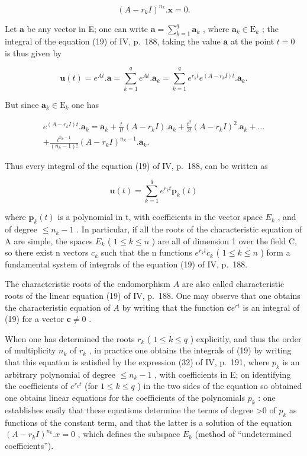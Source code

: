 \[
(A - r _ {k} I) ^ {n _ {k}}. \mathbf {x} = 0.
\]

Let \(\mathbf{a}\) be any vector in E; one can write \(\mathbf{a} = \sum_{k=1}^{q} \mathbf{a}_k\) , where \(\mathbf{a}_k \in \mathrm{E}_k\) ; the integral of the equation (19) of IV, p.~188, taking the value \(\mathbf{a}\) at the point \(t = 0\) is thus given by

\[
\mathbf {u} (t) = e ^ {A t}. \mathbf {a} = \sum_ {k = 1} ^ {q} e ^ {A t}. \mathbf {a} _ {k} = \sum_ {k = 1} ^ {q} e ^ {r _ {k} t} e ^ {(A - r _ {k} I) t}. \mathbf {a} _ {k}.
\]

But since \(\mathbf{a}_k\in \mathrm{E}_k\) one has

\[
\begin{array}{c} e ^ {(A - r _ {k} I) t}. \mathbf {a} _ {k} = \mathbf {a} _ {k} + \frac {t}{1 !} (A - r _ {k} I). \mathbf {a} _ {k} + \frac {t ^ {2}}{2 !} (A - r _ {k} I) ^ {2}. \mathbf {a} _ {k} + \dots \\ + \frac {t ^ {n _ {k} - 1}}{(n _ {k} - 1) !} (A - r _ {k} I) ^ {n _ {k} - 1}. \mathbf {a} _ {k}. \end{array}\tag{31}
\]

Thus every integral of the equation (19) of IV, p.~188, can be written as

\[
\mathbf {u} (t) = \sum_ {k = 1} ^ {q} e ^ {r _ {k} t} \mathbf {p} _ {k} (t)\tag{32}
\]

where \(\mathbf{p}_{k}(t)\) is a polynomial in t, with coefficients in the vector space \(E_{k}\) , and of degree \(\leqslant n_{k}-1\) . In particular, if all the roots of the characteristic equation of A are simple, the spaces \(E_{k}\) ( \(1 \leqslant k \leqslant n\) ) are all of dimension 1 over the field C, so there exist n vectors \(c_{k}\) such that the n functions \(e^{r_{k}t}c_{k}\) ( \(1 \leqslant k \leqslant n\) ) form a fundamental system of integrals of the equation (19) of IV, p.~188.

The characteristic roots of the endomorphism \(A\) are also called characteristic roots of the linear equation (19) of IV, p.~188. One may observe that one obtains the characteristic equation of \(A\) by writing that the function \(\mathbf{c}e^{rt}\) is an integral of (19) for a vector \(\mathbf{c} \neq 0\) .

When one has determined the roots \(r_{k}\) ( \(1 \leqslant k \leqslant q\) ) explicitly, and thus the order of multiplicity \(n_{k}\) of \(r_{k}\) , in practice one obtains the integrals of (19) by writing that this equation is satisfied by the expression (32) of IV, p.~191, where \(p_{k}\) is an arbitrary polynomial of degree \(\leqslant n_{k}-1\) , with coefficients in E; on identifying the coefficients of \(e^{r_{k}t}\) (for \(1 \leqslant k \leqslant q\) ) in the two sides of the equation so obtained one obtains linear equations for the coefficients of the polynomials \(p_{k}\) : one establishes easily that these equations determine the terms of degree \textgreater0 of \(p_{k}\) as functions of the constant term, and that the latter is a solution of the equation \((A - r_{k}I)^{n_{k}}.x = 0\) , which defines the subspace \(E_{k}\) (method of ``undetermined coefficients'').

